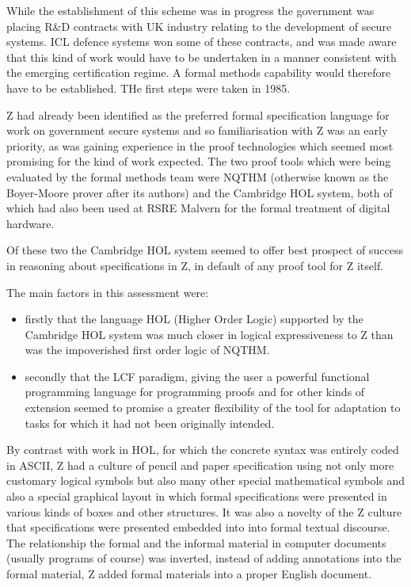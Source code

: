 \documentclass[10pt,titlepage]{book}
\begin{document}
While the establishment of this scheme was in progress the government was placing R\&D contracts with UK industry relating to the development of secure systems.
ICL defence systems won some of these contracts, and was made aware that this kind of work would have to be undertaken in a manner consistent with the emerging certification regime.
A formal methods capability would therefore have to be established.
THe first steps were taken in 1985.

Z had already been identified as the preferred formal specification language for work on government secure systems and so familiarisation with Z was an early priority, as was gaining experience in the proof technologies which seemed most promising for the kind of work expected.
The two proof tools which were being evaluated by the formal methods team were NQTHM (otherwise known as the Boyer-Moore prover after its authors) and the Cambridge HOL system, both of which had also been used at RSRE Malvern for the formal treatment of digital hardware.

Of these two the Cambridge HOL system seemed to offer best prospect of success in reasoning about specifications in Z, in default of any proof tool for Z itself.

The main factors in this assessment were:
\begin{itemize}
\item firstly that the language HOL (Higher Order Logic) supported by the Cambridge HOL system was much closer in logical expressiveness to Z than was the impoverished first order logic of NQTHM.
\item secondly that the LCF paradigm, giving the user a powerful functional programming language for programming proofs and for other kinds of extension seemed to promise a greater flexibility of the tool for adaptation to tasks for which it had not been originally intended.
\end{itemize}

By contrast with work in HOL, for which the concrete syntax was entirely coded in ASCII, Z had a culture of pencil and paper specification using not only more customary logical symbols but also many other special mathematical symbols and also a special graphical layout in which formal specifications were presented in various kinds of boxes and other structures.
It was also a novelty of the Z culture that specifications were presented embedded into into formal textual discourse.
The relationship the formal and the informal material in computer documents (usually programs of course) was inverted, instead of adding annotations into the formal material, Z added formal materials into a proper English document.
\end{document}
